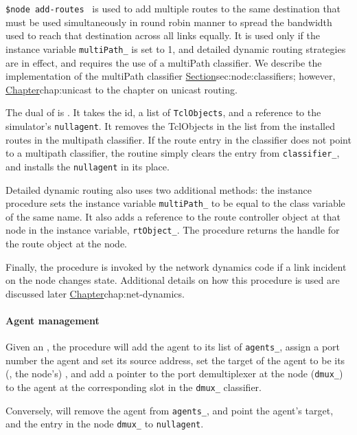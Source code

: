 {\tt \$node add-routes  } %
is used to add multiple routes to the same destination that must be used
simultaneously in round robin manner to spread the bandwidth used to reach
that destination across all links equally.
It is used only if the instance variable {\tt multiPath\_} is set to 1,
and detailed dynamic routing strategies are in effect,
and requires the use of a multiPath classifier.
We describe the implementation of the multiPath classifier
\href{later in this chapter}{Section}{sec:node:classifiers};
however, \href{we defer the discussion of multipath
routing}{Chapter}{chap:unicast} to the chapter on unicast routing.

The dual of  is .
It takes the id, a list of {\tt TclObjects}, and a reference to
the simulator's {\tt nullagent}.
It removes the TclObjects in the list from the installed routes in the
multipath classifier.
If the route entry in the classifier does not point to a multipath
classifier,
the routine simply clears the entry from {\tt classifier\_}, and
installs the {\tt nullagent} in its place.

Detailed dynamic routing also uses two additional methods:
the instance procedure  sets the instance variable
{\tt multiPath\_} to be equal to the class variable of the same name.
It also adds a reference to the route controller object at that node
in the instance variable, {\tt rtObject\_}.
The procedure  returns the handle for the route object 
at the node.

Finally, the procedure  is invoked by
the network dynamics code if a link incident on the node
changes state.  Additional details on how this procedure
is used are discussed later
\href{in the chapter on network dynamics}{Chapter}{chap:net-dynamics}.

\paragraph{Agent management}
Given an , the procedure  will
add the agent to its list of {\tt agents\_},
assign a port number the agent and set its source address,
set the target of the agent to be its (\ie, the node's) ,
and add a pointer to the port demultiplexer at the node ({\tt dmux\_})
to the agent at the corresponding slot in the {\tt dmux\_} classifier.

Conversely, will remove the agent from {\tt agents\_},
and point the agent's target, and the entry in the node {\tt dmux\_}
to {\tt nullagent}.


